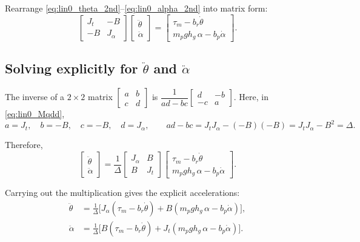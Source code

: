 \documentclass[12pt,a4paper]{article}
\begin{document}
Rearrange \eqref{eq:lin0_theta_2nd}--\eqref{eq:lin0_alpha_2nd} into matrix form:
\begin{equation}
\begin{bmatrix}
J_t & -B\\
-B & J_\alpha
\end{bmatrix}
\begin{bmatrix}
\ddot\theta\\
\ddot\alpha
\end{bmatrix}
=
\begin{bmatrix}
\tau_m - b_r\dot\theta\\
m_p g h_g\,\alpha - b_p\dot\alpha
\end{bmatrix}.
\label{eq:lin0_Mqdd}
\end{equation}

\subsection{Solving explicitly for $\ddot\theta$ and $\ddot\alpha$}

The inverse of a $2\times2$ matrix
$
\begin{bmatrix} a & b\\ c & d \end{bmatrix}
$
is
$
\dfrac{1}{ad-bc}
\begin{bmatrix} d & -b\\ -c & a \end{bmatrix}
$.
Here, in \eqref{eq:lin0_Mqdd},
\[
a=J_t,\quad b=-B,\quad c=-B,\quad d=J_\alpha,
\qquad
ad-bc = J_tJ_\alpha - (-B)(-B)=J_tJ_\alpha-B^2=\Delta.
\]

Therefore,
\[
\begin{bmatrix}
\ddot\theta\\
\ddot\alpha
\end{bmatrix}
=
\frac{1}{\Delta}
\begin{bmatrix}
J_\alpha & B\\
B & J_t
\end{bmatrix}
\begin{bmatrix}
\tau_m - b_r\dot\theta\\
m_p g h_g\,\alpha - b_p\dot\alpha
\end{bmatrix}.
\]

Carrying out the multiplication gives the explicit accelerations:
\begin{align}
\ddot\theta
&=
\frac{1}{\Delta}
\Big[
J_\alpha(\tau_m-b_r\dot\theta)
+
B(m_p g h_g\,\alpha-b_p\dot\alpha)
\Big],
\label{eq:theta_ddot_lin0_again}\\[6pt]
\ddot\alpha
&=
\frac{1}{\Delta}
\Big[
B(\tau_m-b_r\dot\theta)
+
J_t(m_p g h_g\,\alpha-b_p\dot\alpha)
\Big].
\label{eq:alpha_ddot_lin0_again}
\end{align}
\end{document}
